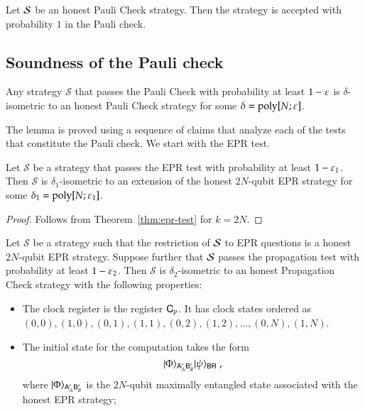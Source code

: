 \begin{lemma}\label{lem:paulicheck-compleness}
Let $\mathcal{S}$ be an honest Pauli Check strategy. Then the strategy is accepted with probability $1$ in the Pauli check.
\end{lemma}


\subsection{Soundness of the Pauli check}

\begin{lemma}\label{lem:paulicheck-soundness}
Any strategy $\mathcal{S}$ that passes the Pauli Check with probability at least $1 - \varepsilon$ is $\delta$-isometric to an honest Pauli Check strategy for some $\delta = \operatorname{poly}[N;\varepsilon]$.
\end{lemma}

The lemma is proved using a sequence of claims that analyze each of the tests that constitute the Pauli check. We start with the EPR test. 

\begin{claim}
Let $\mathcal{S}$ be a strategy that passes the EPR test with probability at least $1 - \varepsilon_1$. Then $\mathcal{S}$ is $\delta_1$-isometric to an extension of the honest $2N$-qubit EPR strategy for some $\delta_1 = \operatorname{poly}[N;\varepsilon_1]$.
\end{claim}

\begin{proof}
Follows from Theorem~\ref{thm:epr-test} for $k=2N$. 
\end{proof}

\begin{claim}\label{claim:pauli-propagation}
Let $\mathcal{S}$ be a strategy such that the restriction of $\mathcal{S}$ to EPR questions is a honest $2N$-qubit EPR strategy. Suppose further that $\mathcal{S}$ passes the propagation test with probability at least $1-\varepsilon_2$. Then $\mathcal{S}$ is $\delta_2$-isometric to an honest Propagation Check strategy with the following properties:
\begin{itemize}
\item The clock register is the register ${\mathsf{C}}_p$. It has clock states ordered as $(0,0),(1,0),(0,1),(1,1),(0,2),(1,2),\ldots,(0,N),(1,N)$. 
\item The initial state for the computation takes the form 
\begin{equation}\label{eq:pauli-prop-1}
\ket{\Phi}_{\sA'_A\sB'_B} \ket{\psi}_{\sB\sR}\;,
\end{equation}
where $|\Phi\rangle_{{\mathsf{A}}'_A{\mathsf{B}}'_B}$ is the $2N$-qubit maximally entangled state associated with the honest EPR strategy;
\end{itemize}
\end{claim}

